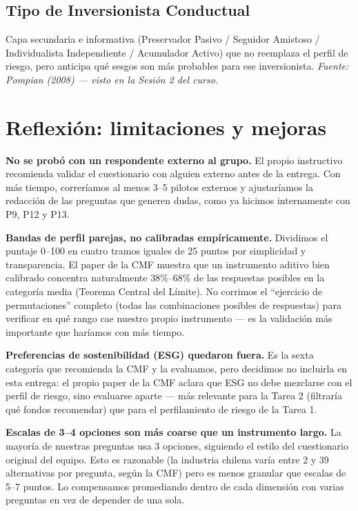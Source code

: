 \documentclass[11pt]{article}
\begin{document}
\subsection{Tipo de Inversionista Conductual}
Capa secundaria e informativa (Preservador Pasivo / Seguidor Amistoso / Individualista Independiente / Acumulador Activo) que no reemplaza el perfil de riesgo, pero anticipa qué sesgos son más probables para ese inversionista. \textit{Fuente: Pompian (2008) --- visto en la Sesión 2 del curso.}

\section{Reflexión: limitaciones y mejoras}

\textbf{No se probó con un respondente externo al grupo.} El propio instructivo recomienda validar el cuestionario con alguien externo antes de la entrega. Con más tiempo, correríamos al menos 3--5 pilotos externos y ajustaríamos la redacción de las preguntas que generen dudas, como ya hicimos internamente con P9, P12 y P13.

\textbf{Bandas de perfil parejas, no calibradas empíricamente.} Dividimos el puntaje 0--100 en cuatro tramos iguales de 25 puntos por simplicidad y transparencia. El paper de la CMF muestra que un instrumento aditivo bien calibrado concentra naturalmente 38\%--68\% de las respuestas posibles en la categoría media (Teorema Central del Límite). No corrimos el ``ejercicio de permutaciones'' completo (todas las combinaciones posibles de respuestas) para verificar en qué rango cae nuestro propio instrumento --- es la validación más importante que haríamos con más tiempo.

\textbf{Preferencias de sostenibilidad (ESG) quedaron fuera.} Es la sexta categoría que recomienda la CMF y la evaluamos, pero decidimos no incluirla en esta entrega: el propio paper de la CMF aclara que ESG no debe mezclarse con el perfil de riesgo, sino evaluarse aparte --- más relevante para la Tarea 2 (filtraría qué fondos recomendar) que para el perfilamiento de riesgo de la Tarea 1.

\textbf{Escalas de 3--4 opciones son más coarse que un instrumento largo.} La mayoría de nuestras preguntas usa 3 opciones, siguiendo el estilo del cuestionario original del equipo. Esto es razonable (la industria chilena varía entre 2 y 39 alternativas por pregunta, según la CMF) pero es menos granular que escalas de 5--7 puntos. Lo compensamos promediando dentro de cada dimensión con varias preguntas en vez de depender de una sola.
\end{document}
